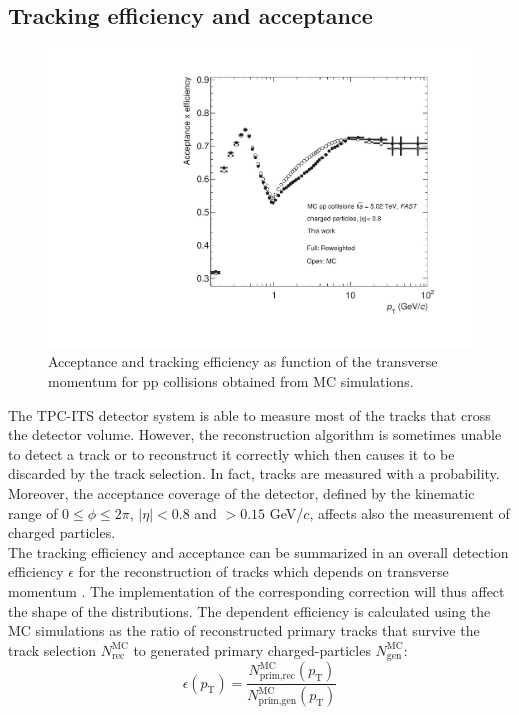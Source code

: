 \documentclass[12pt,a4paper]{report}
\begin{document}
\subsection{Tracking efficiency and acceptance}
\begin{figure}[tb!]
\centering
\includegraphics[width=12cm]{Plots/trckEffpp.pdf}  
\caption{Acceptance and tracking efficiency as function of the transverse momentum for pp collisions obtained from MC simulations.}
\label{trckEffpp}
\end{figure}
The TPC-ITS detector system is able to measure most of the tracks that cross the detector volume. However, the reconstruction algorithm is sometimes unable to detect a track or to reconstruct it correctly which then causes it to be discarded by the track selection. In fact, tracks are measured with a probability. Moreover, the acceptance coverage of the detector, defined by the kinematic range of $0 \leq \phi \leq 2\pi$, $|\eta| < 0.8$ and \pt $> 0.15$ GeV/$c$, affects also the measurement of charged particles. \\
The tracking efficiency and acceptance can be summarized in an overall detection efficiency $\epsilon$ for the reconstruction of tracks which depends on transverse momentum \pt. The implementation of the corresponding correction will thus affect the shape of the \pt distributions. The \pt dependent efficiency is calculated using the MC simulations as the ratio of reconstructed primary tracks that survive the track selection $N_\text{rec}^\text{MC}$ to generated primary charged-particles $N_\text{gen}^\text{MC}$: 
\begin{equation}
\epsilon(p_\text{T}) = \dfrac{N_\text{prim,rec}^\text{MC}(p_\text{T})}{N_\text{prim,gen}^\text{MC}(p_\text{T})} 
\label{trckEffEq}
\end{equation}
\end{document}
